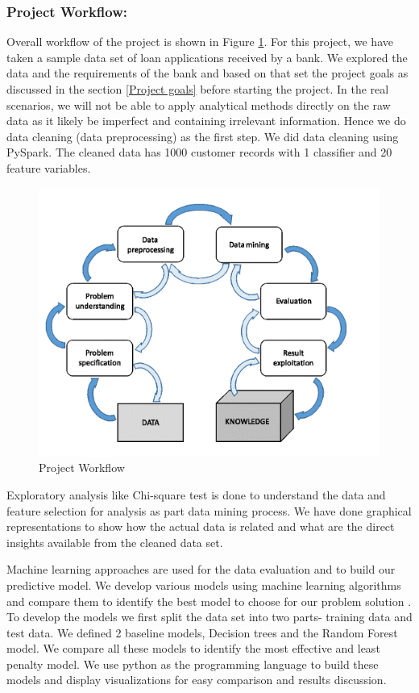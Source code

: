 \documentclass[sigconf]{acmart}
\begin{document}
\subsubsection{Project Workflow:}

Overall workflow of the project is shown in Figure \ref{fig:Figure1}. 
For this project, we have taken a sample data set of loan applications received by a bank. We explored the data and the requirements of the bank and based on that set the project goals as discussed in the section \ref{Project goals} before starting the project. In the real scenarios, we will not be able to apply analytical methods directly on the raw data as it likely be imperfect and containing irrelevant information. Hence we do data cleaning (data preprocessing) as the first step. We did data cleaning using PySpark. The cleaned data has 1000 customer records with 1 classifier and 20 feature variables.

\begin{figure}[htb]
  \centering
  \includegraphics[width=1.0\columnwidth]{images/Figure1.png}
  \caption{Project Workflow
  \cite{preprocessing}}
  \label{fig:Figure1} 
\end{figure}

Exploratory analysis like Chi-square test is done to understand the data and feature selection for analysis as part data mining process. We have done graphical representations to show how the actual data is related and what are the direct insights available from the cleaned data set.

Machine learning approaches are used for the data evaluation and to build our predictive model. We develop various models using machine learning algorithms and compare them to identify the best model to choose for our problem solution \cite{sas-machine-learning}. To develop the models we first split the data set into two parts- training data and test data. We defined 2 baseline models, Decision trees and the Random Forest model.  We compare all these models to identify the most effective and least penalty model. We use python as the programming language to build these models and display visualizations for easy comparison and results discussion.
\end{document}

